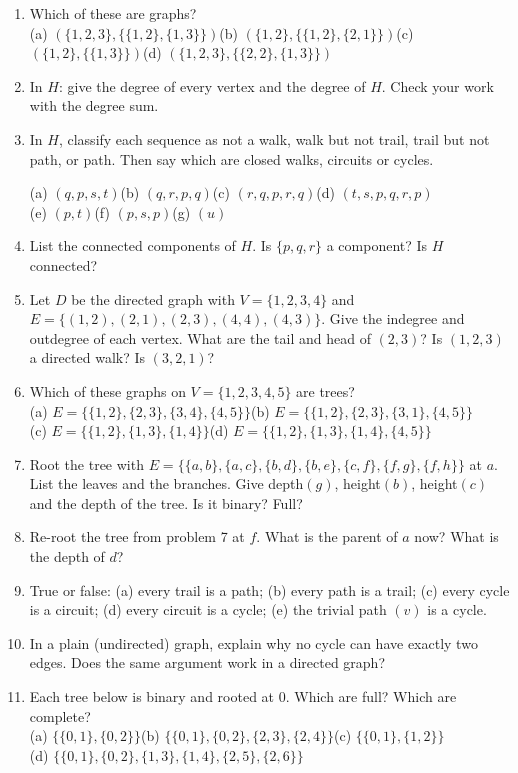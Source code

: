 \begin{enumerate}
\item Which of these are graphs?\\
(a) $(\{1,2,3\},\{\{1,2\},\{1,3\}\})$\quad (b) $(\{1,2\},\{\{1,2\},\{2,1\}\})$\quad (c) $(\{1,2\},\{\{1,3\}\})$\quad (d) $(\{1,2,3\},\{\{2,2\},\{1,3\}\})$
\item In $H$: give the degree of every vertex and the degree of $H$. Check your work with the degree sum.
\item In $H$, classify each sequence as not a walk, walk but not trail, trail but not path, or path. Then say which are closed walks, circuits or cycles.
\begin{center}
(a) $(q,p,s,t)$\quad (b) $(q,r,p,q)$\quad (c) $(r,q,p,r,q)$\quad (d) $(t,s,p,q,r,p)$\\
(e) $(p,t)$\quad (f) $(p,s,p)$\quad (g) $(u)$
\end{center}
\item List the connected components of $H$. Is $\{p,q,r\}$ a component? Is $H$ connected?
\item Let $D$ be the directed graph with $V=\{1,2,3,4\}$ and $E=\{(1,2),(2,1),(2,3),(4,4),(4,3)\}$. Give the indegree and outdegree of each vertex. What are the tail and head of $(2,3)$? Is $(1,2,3)$ a directed walk? Is $(3,2,1)$?
\item Which of these graphs on $V=\{1,2,3,4,5\}$ are trees?\\
(a) $E=\{\{1,2\},\{2,3\},\{3,4\},\{4,5\}\}$\quad (b) $E=\{\{1,2\},\{2,3\},\{3,1\},\{4,5\}\}$\\
(c) $E=\{\{1,2\},\{1,3\},\{1,4\}\}$\quad (d) $E=\{\{1,2\},\{1,3\},\{1,4\},\{4,5\}\}$
\item Root the tree with $E=\{\{a,b\},\{a,c\},\{b,d\},\{b,e\},\{c,f\},\{f,g\},\{f,h\}\}$ at $a$. List the leaves and the branches. Give depth$(g)$, height$(b)$, height$(c)$ and the depth of the tree. Is it binary? Full?
\item Re-root the tree from problem 7 at $f$. What is the parent of $a$ now? What is the depth of $d$?
\item True or false: (a) every trail is a path; (b) every path is a trail; (c) every cycle is a circuit; (d) every circuit is a cycle; (e) the trivial path $(v)$ is a cycle.
\item In a plain (undirected) graph, explain why no cycle can have exactly two edges. Does the same argument work in a directed graph?
\item Each tree below is binary and rooted at $0$. Which are full? Which are complete?\\
(a) $\{\{0,1\},\{0,2\}\}$\quad (b) $\{\{0,1\},\{0,2\},\{2,3\},\{2,4\}\}$\quad (c) $\{\{0,1\},\{1,2\}\}$\\
(d) $\{\{0,1\},\{0,2\},\{1,3\},\{1,4\},\{2,5\},\{2,6\}\}$
\end{enumerate}

